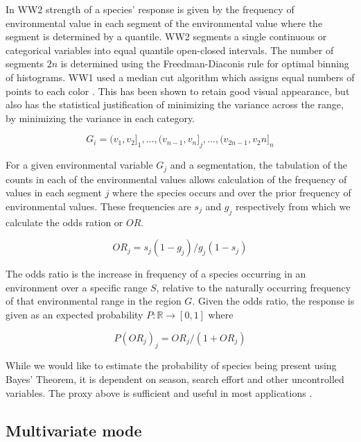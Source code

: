 \documentclass[10pt]{article}
\begin{document}
In WW2 strength of a species' response is given by the frequency of environmental value in each segment of the environmental value where the segment is determined by a quantile. WW2 segments a single continuous or categorical variables into equal quantile open-closed intervals. The number of segments $2n$ is determined using the Freedman-Diaconis rule \cite{Freedman1981} for optimal binning of histograms.  WW1 \cite{Stockwell:2006xt} used a median cut algorithm which assigns equal numbers of points to each color \cite{Heckbert82}.  This has been shown to retain good visual appearance, but also has the statistical justification of minimizing the variance across the range, by minimizing the variance in each category.  

\begin{equation}
G_i = (v_1,v_2]_1, ... , (v_{n-1},v_n]_j , ... , (v_{2n-1},v_2n]_n
\end{equation}

For a given environmental variable $G_j$ and a segmentation, the tabulation of the counts in each of the environmental values allows calculation of the frequency of values in each segment $j$ where the species occurs and over the prior frequency of environmental values. These frequencies are $s_j$ and $g_j$ respectively from which we calculate the odds ration or $OR$.

\begin{equation}
OR_j = s_j (1-g_j) / g_j (1 - s_j)
\end{equation}

The odds ratio is the increase in frequency of a species occurring in an environment over a specific range $S$, relative to the naturally occurring frequency of that environmental range in the region $G$.  Given the odds ratio, the response is given as an expected probability $P: \mathbb{R} \rightarrow [0,1]$ where 

\begin{equation}
P(OR_j)_j =OR_j/(1+OR_j) 
\end{equation}

While we would like to estimate the probability of species being present using Bayes' Theorem, it is dependent on season, search effort and other uncontrolled variables.  The proxy above is sufficient and useful in most applications \cite{Stockwell:1993yg,Stockwell:1997yg}. 

\subsection{Multivariate mode}
\end{document}
